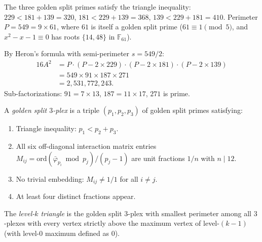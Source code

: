 \begin{result}
The three golden split primes satisfy the triangle inequality:
$229 < 181 + 139 = 320$,
$181 < 229 + 139 = 368$,
$139 < 229 + 181 = 410$.
Perimeter $P = 549 = 9 \times 61$, where $61$ is itself a golden
split prime ($61 \equiv 1 \pmod{5}$, and $x^2 - x - 1 \equiv 0$ has
roots $\{14, 48\}$ in $\mathbb{F}_{61}$).
\end{result}

\begin{result}
By Heron's formula with semi-perimeter $s = 549/2$:
\begin{align}
  16 A^2 &= P \cdot (P - 2 \times 229) \cdot (P - 2 \times 181)
    \cdot (P - 2 \times 139) \\
  &= 549 \times 91 \times 187 \times 271 \\
  &= 2{,}531{,}772{,}243.
\end{align}
Sub-factorizations: $91 = 7 \times 13$, $187 = 11 \times 17$,
$271$ is prime.
\end{result}

\begin{definition}
\label{def:3plex}
A \emph{golden split $3$-plex} is a triple $(p_1, p_2, p_3)$ of
golden split primes satisfying:
\begin{enumerate}
\item Triangle inequality: $p_1 < p_2 + p_3$.
\item All six off-diagonal interaction matrix entries $M_{ij} =
  \mathrm{ord}(\bar\varphi_{p_i} \bmod p_j) / (p_j - 1)$
  are unit fractions $1/n$ with $n \mid 12$.
\item No trivial embedding: $M_{ij} \neq 1/1$ for all $i \neq j$.
\item At least four distinct fractions appear.
\end{enumerate}
\end{definition}

\begin{definition}
\label{def:level}
The \emph{level-$k$ triangle} is the golden split $3$-plex with
smallest perimeter among all $3$-plexes with every vertex strictly
above the maximum vertex of level-$(k-1)$ (with level-$0$ maximum
defined as $0$).
\end{definition}

